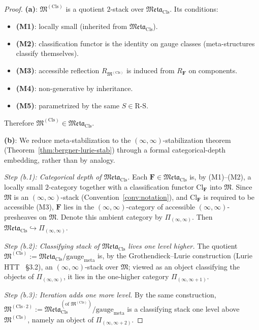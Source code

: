 \documentclass[11pt]{article}
\theoremstyle{plain}
\theoremstyle{definition}
\newcommand{\RS}{\mathrm{R\text{-}S}}
\newcommand{\fM}{\mathfrak{M}}
\newcommand{\Meta}{\mathfrak{Meta}}
\newcommand{\Cl}{\mathrm{Cl}}
\begin{document}
\begin{proof}

\textbf{(a)}: $\fM^{(\mathrm{Cls})}$ is a quotient $2$-stack over $\Meta_{\mathrm{Cls}}$. Its conditions:
\begin{itemize}
\item \textbf{(M1)}: locally small (inherited from $\Meta_{\mathrm{Cls}}$).
\item \textbf{(M2)}: classification functor is the identity on gauge classes (meta-structures classify themselves).
\item \textbf{(M3)}: accessible reflection $R_{\fM^{(\mathrm{Cls})}}$ is induced from $R_{\mathbf{F}}$ on components.
\item \textbf{(M4)}: non-generative by inheritance.
\item \textbf{(M5)}: parametrized by the same $S \in \RS$.
\end{itemize}
Therefore $\fM^{(\mathrm{Cls})} \in \Meta_{\mathrm{Cls}}$.

\textbf{(b)}: We reduce meta-stabilization to the $(\infty, \infty)$-stabilization theorem (Theorem~\ref{thm:bergner-lurie-stab}) through a formal categorical-depth embedding, rather than by analogy.

\emph{Step (b.1): Categorical depth of $\Meta_{\mathrm{Cls}}$.} Each $\mathbf{F} \in \Meta_{\mathrm{Cls}}$ is, by (M1)--(M2), a locally small $2$-category together with a classification functor $\Cl_{\mathbf{F}}$ into $\fM$. Since $\fM$ is an $(\infty, \infty)$-stack (Convention~\ref{conv:notation}), and $\Cl_{\mathbf{F}}$ is required to be accessible (M3), $\mathbf{F}$ lies in the $(\infty, \infty)$-category of accessible $(\infty, \infty)$-presheaves on $\fM$. Denote this ambient category by $\Pi_{(\infty, \infty)}$. Then $\Meta_{\mathrm{Cls}} \hookrightarrow \Pi_{(\infty, \infty)}$.

\emph{Step (b.2): Classifying stack of $\Meta_{\mathrm{Cls}}$ lives one level higher.} The quotient $\fM^{(\mathrm{Cls})} := \Meta_{\mathrm{Cls}} / \mathrm{gauge}_{\mathrm{meta}}$ is, by the Grothendieck--Lurie construction (Lurie HTT~\cite{LurieHTT} \S 3.2), an $(\infty, \infty)$-stack over $\fM$; viewed as an object classifying the objects of $\Pi_{(\infty, \infty)}$, it lies in the one-higher category $\Pi_{(\infty, \infty + 1)}$.

\emph{Step (b.3): Iteration adds one more level.} By the same construction, $\fM^{(\mathrm{Cls}\cdot 2)} := \Meta_{\mathrm{Cls}}^{(\text{of } \fM^{(\mathrm{Cls})})} / \mathrm{gauge}_{\mathrm{meta}}$ is a classifying stack one level above $\fM^{(\mathrm{Cls})}$, namely an object of $\Pi_{(\infty, \infty + 2)}$.


\end{proof}
\end{document}
